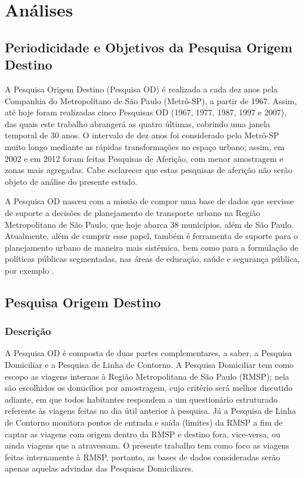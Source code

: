 \chapter{Análises}\label{chap:analises-preliminares}

\section{Periodicidade e Objetivos da Pesquisa Origem Destino}\label{sec:period-obj}

A Pesquisa Origem Destino (Pesquisa OD) é realizada a cada dez anos pela Companhia do Metropolitano de São Paulo (Metrô-SP), a partir de 1967. Assim, até hoje foram realizadas cinco Pesquisas OD (1967, 1977, 1987, 1997 e 2007), das quais este trabalho abrangerá as quatro últimas, cobrindo uma janela temporal de 30 anos. O intervalo de dez anos foi considerado pelo Metrô-SP muito longo mediante as rápidas transformações no espaço urbano; assim, em 2002 e em 2012 foram feitas Pesquisas de Aferição, com menor amostragem e zonas mais agregadas. Cabe esclarecer que estas pesquisas de aferição não serão objeto de análise do presente estudo.

A Pesquisa OD nasceu com a missão de compor uma base de dados que servisse de suporte a decisões de planejamento de transporte urbano na Região Metropolitana de São Paulo, que hoje abarca 38 municípios, além de São Paulo. Atualmente, além de cumprir esse papel, também é ferramenta de suporte para o planejamento urbano de maneira mais sistêmica, bem como para a formulação de políticas públicas segmentadas, nas áreas de educação, saúde e segurança pública, por exemplo \cite{MANUALOD2007}.

\section{Pesquisa Origem Destino}\label{sec:OD}

\subsection{Descrição}\label{subsec:OD-descr}

A Pesquisa OD é composta de duas partes complementares, a saber, a Pesquisa Domiciliar e a Pesquisa de Linha de Contorno. A Pesquisa Domiciliar tem como escopo as viagens internas à Região Metropolitana de São Paulo (RMSP); nela são escolhidos os domicílios por amostragem, cujo critério será melhor discutido adiante, em que todos habitantes respondem a um questionário estruturado referente às viagens feitas no dia útil anterior à pesquisa. Já a Pesquisa de Linha de Contorno monitora pontos de entrada e saída (limites) da RMSP a fim de captar as viagens com origem dentro da RMSP e destino fora, vice-versa, ou ainda viagens que a atravessam. O presente trabalho tem como foco as viagens feitas internamente à RMSP, portanto, as bases de dados consideradas serão apenas aquelas advindas das Pesquisas Domiciliares.

